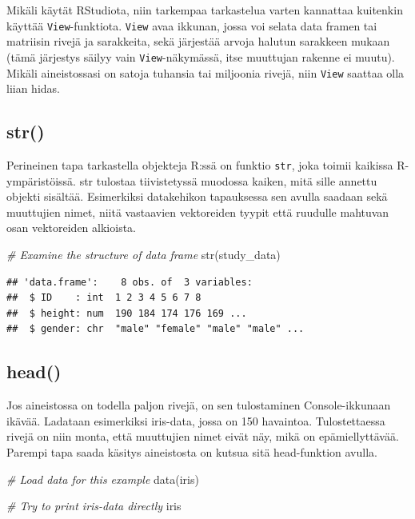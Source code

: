 \documentclass[
]{book}
\newenvironment{Shaded}{\begin{snugshade}}{\end{snugshade}}
\newcommand{\CommentTok}[1]{\textcolor[rgb]{0.56,0.35,0.01}{\textit{#1}}}
\newcommand{\FunctionTok}[1]{\textcolor[rgb]{0.00,0.00,0.00}{#1}}
\newcommand{\NormalTok}[1]{#1}
\begin{document}
Mikäli käytät RStudiota, niin tarkempaa tarkastelua varten kannattaa kuitenkin käyttää \texttt{View}-funktiota. \texttt{View} avaa ikkunan, jossa voi selata data framen tai matriisin rivejä ja sarakkeita, sekä järjestää arvoja halutun sarakkeen mukaan (tämä järjestys säilyy vain \texttt{View}-näkymässä, itse muuttujan rakenne ei muutu). Mikäli aineistossasi on satoja tuhansia tai miljoonia rivejä, niin \texttt{View} saattaa olla liian hidas.

\hypertarget{str}{%
\subsection{str()}\label{str}}

Perineinen tapa tarkastella objekteja R:ssä on funktio \texttt{str}, joka toimii kaikissa R-ympäristöissä. str tulostaa tiivistetyssä muodossa kaiken, mitä sille annettu objekti sisältää. Esimerkiksi datakehikon tapauksessa sen avulla saadaan sekä muuttujien nimet, niitä vastaavien vektoreiden tyypit että ruudulle mahtuvan osan vektoreiden alkioista.

\begin{Shaded}
\begin{Highlighting}[]
\CommentTok{\# Examine the structure of data frame}
\FunctionTok{str}\NormalTok{(study\_data)}
\end{Highlighting}
\end{Shaded}

\begin{verbatim}
## 'data.frame':    8 obs. of  3 variables:
##  $ ID    : int  1 2 3 4 5 6 7 8
##  $ height: num  190 184 174 176 169 ...
##  $ gender: chr  "male" "female" "male" "male" ...
\end{verbatim}

\hypertarget{head}{%
\subsection{head()}\label{head}}

Jos aineistossa on todella paljon rivejä, on sen tulostaminen Console-ikkunaan ikävää. Ladataan esimerkiksi iris-data, jossa on 150 havaintoa. Tulostettaessa rivejä on niin monta, että muuttujien nimet eivät näy, mikä on epämiellyttävää. Parempi tapa saada käsitys aineistosta on kutsua sitä head-funktion avulla.

\begin{Shaded}
\begin{Highlighting}[]
\CommentTok{\# Load data for this example}
\FunctionTok{data}\NormalTok{(iris)}

\CommentTok{\# Try to print iris{-}data directly}
\NormalTok{iris}
\end{Highlighting}
\end{Shaded}
\end{document}
